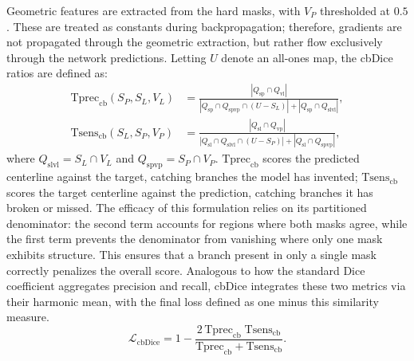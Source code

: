 \documentclass[11pt,a4paper]{article}
\begin{document}
Geometric features are extracted from the hard masks, with $V_P$ thresholded
at $0.5$. These are treated as constants during backpropagation; therefore,
gradients are not propagated through the geometric extraction, but rather
flow exclusively through the network predictions. Letting $U$ denote an
all-ones map, the cbDice ratios are defined as:
\begin{equation}
\begin{aligned}
\mathrm{Tprec}_{\mathrm{cb}}(S_P, S_L, V_L) &=
 \frac{|Q_{\mathrm{sp}} \cap Q_{\mathrm{vl}}|}
      {|Q_{\mathrm{sp}} \cap Q_{\mathrm{spvp}} \cap (U - S_L)|
       + |Q_{\mathrm{sp}} \cap Q_{\mathrm{slvl}}|}, \\[4pt]
\mathrm{Tsens}_{\mathrm{cb}}(S_L, S_P, V_P) &=
 \frac{|Q_{\mathrm{sl}} \cap Q_{\mathrm{vp}}|}
      {|Q_{\mathrm{sl}} \cap Q_{\mathrm{slvl}} \cap (U - S_P)|
       + |Q_{\mathrm{sl}} \cap Q_{\mathrm{spvp}}|},
\end{aligned}
\label{eq:cbdice}
\end{equation}
where $Q_{\mathrm{slvl}} = S_L \cap V_L$ and $Q_{\mathrm{spvp}} = S_P \cap
V_P$. $\mathrm{Tprec}_{\mathrm{cb}}$ scores the predicted centerline against the
target, catching branches the model has invented;
$\mathrm{Tsens}_{\mathrm{cb}}$ scores the target centerline against the
prediction, catching branches it has broken or missed. The efficacy of this formulation relies on its
partitioned denominator: the second term accounts for regions where both
masks agree, while the first term prevents the denominator from vanishing
where only one mask exhibits structure. This ensures that a branch present
in only a single mask correctly penalizes the overall score. Analogous to
how the standard Dice coefficient aggregates precision and recall, cbDice
integrates these two metrics via their harmonic mean, with the final loss
defined as one minus this similarity measure.
\begin{equation}
\mathcal{L}_{\text{cbDice}}
 = 1 - \frac{2\,\mathrm{Tprec}_{\mathrm{cb}}\;\mathrm{Tsens}_{\mathrm{cb}}}
            {\mathrm{Tprec}_{\mathrm{cb}} + \mathrm{Tsens}_{\mathrm{cb}}} .
\label{eq:cbdice-loss}
\end{equation}
\end{document}
